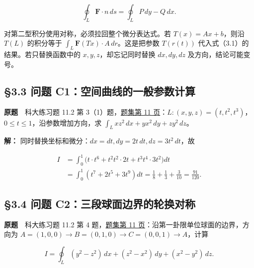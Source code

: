 \documentclass[11pt,a4paper]{article}
\begin{document}
\begin{equation*}
 \oint_L\mathbf F\cdot n\,ds=\oint_LP\,dy-Q\,dx.\tag{3.3}
\end{equation*}

对第二型积分使用对称，必须拉回整个微分表达式。若 \(T(x)=Ax+b\)，则沿
\(T(L)\) 的积分等于 \(\int_L\mathbf F(Tx)\cdot A\,dr\)。这是把参数
\(T(r(t))\) 代入式（3.1）的结果。若只替换函数中的
\(x,y,z\)，却忘记同时替换 \(dx,dy,dz\) 及方向，结论可能变号。

\subsection{§3.3 问题
C1：空间曲线的一般参数计算}\label{ux95eeux9898-c1ux7a7aux95f4ux66f2ux7ebfux7684ux4e00ux822cux53c2ux6570ux8ba1ux7b97}

\textbf{原题}　科大练习题 11.2 第
3（1）题，\href{https://zj139.github.io/math-notes/files/problems/科大数分习题-v2\%282\%29.pdf\#page=11}{题集第
11 页}：\(L:(x,y,z)=(t,t^2,t^3)\)，\(0\le t\le1\)，沿参数增加方向，求
\(\int_Lxz^2\,dx+yx^2\,dy+zy^2\,dz\)。

\textbf{解：} 同时替换坐标和微分：\(dx=dt,dy=2t\,dt,dz=3t^2\,dt\)，故

\begin{equation*}
\begin{aligned}
 I&=\int_0^1\bigl(t\cdot t^6+t^2t^2\cdot2t+t^3t^4\cdot3t^2\bigr)dt\\
 &=\int_0^1(t^7+2t^5+3t^9)dt
 =\frac18+\frac13+\frac3{10}=\frac{91}{120}.
\end{aligned}
\end{equation*}

\subsection{§3.4 问题
C2：三段球面边界的轮换对称}\label{ux95eeux9898-c2ux4e09ux6bb5ux7403ux9762ux8fb9ux754cux7684ux8f6eux6362ux5bf9ux79f0}

\textbf{原题}　科大练习题 11.2 第 4
题，\href{https://zj139.github.io/math-notes/files/problems/科大数分习题-v2\%282\%29.pdf\#page=11}{题集第
11 页}：沿第一卦限单位球面的边界，方向为
\(A=(1,0,0)\to B=(0,1,0)\to C=(0,0,1)\to A\)，计算

\begin{equation*}
 I=\oint_L(y^2-z^2)\,dx+(z^2-x^2)\,dy+(x^2-y^2)\,dz.
\end{equation*}
\end{document}

